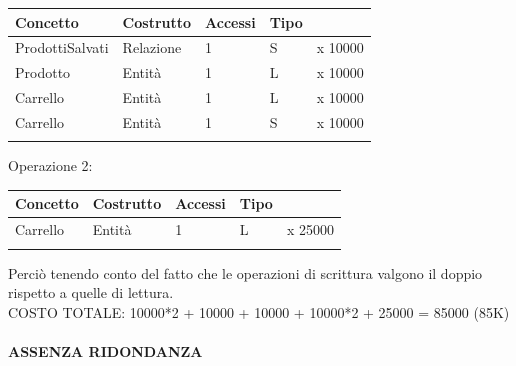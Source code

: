 \documentclass[10pt]{article}
\begin{document}
\newcommand{\noline}[1]{\multicolumn{1}{c}{#1}}
\newcommand{\myline}{\cline{1-4}}
\begin{center}
    \begin{tabularx}{\textwidth} {
        | >{\raggedright\arraybackslash}X |
        >{\raggedright\arraybackslash}X |
        >{\raggedright\arraybackslash}X |
        >{\raggedright\arraybackslash}X |
        c                               |
    }

        \myline
        \textbf{Concetto} & \textbf{Costrutto} & \textbf{Accessi} & \textbf{Tipo} \\
        \myline

        ProdottiSalvati &
        Relazione &
        1 &
        S &
        \noline{x 10000} \\
        \myline

        Prodotto &
        Entità &
        1 &
        L &
        \noline{x 10000} \\
        \myline

        Carrello &
        Entità &
        1 &
        L &
        \noline{x 10000} \\
        \myline

        Carrello &
        Entità &
        1 &
        S &
        \noline{x 10000} \\
        \myline
    \end{tabularx}
\end{center}
Operazione 2:
\begin{center}
    \begin{tabularx}{\textwidth} {
        | >{\raggedright\arraybackslash}X |
        >{\raggedright\arraybackslash}X |
        >{\raggedright\arraybackslash}X |
        >{\raggedright\arraybackslash}X |
        c                               |
    }

        \myline
        \textbf{Concetto} & \textbf{Costrutto} & \textbf{Accessi} & \textbf{Tipo} \\
        \myline

        Carrello &
        Entità &
        1 &
        L &
        \noline{x 25000} \\
        \myline
    \end{tabularx}
\end{center}
Perciò tenendo conto del fatto che le operazioni di scrittura valgono il doppio rispetto a quelle di lettura.\\
COSTO TOTALE: 10000*2 + 10000 + 10000 + 10000*2 + 25000 = 85000 (85K)\\\\
\textbf{ASSENZA RIDONDANZA}
\end{document}
